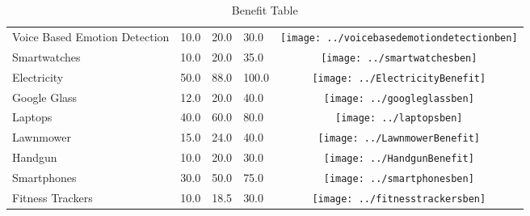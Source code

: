 \begin{table}[t]
\begin{center}
\begin{tabular}{| p{2cm} | p{1cm} | p{1cm} | p{1cm} | c |}
Voice Based Emotion Detection  & 10.0 & 20.0 & 30.0 & \texttt{[image: ../voicebasedemotiondetectionben]} \\ 
Smartwatches  & 10.0 & 20.0 & 35.0 & \texttt{[image: ../smartwatchesben]} \\ 
Electricity & 50.0 & 88.0 & 100.0 & \texttt{[image: ../ElectricityBenefit]} \\ 
Google Glass  & 12.0 & 20.0 & 40.0 & \texttt{[image: ../googleglassben]} \\ 
Laptops  & 40.0 & 60.0 & 80.0 & \texttt{[image: ../laptopsben]} \\ 
Lawnmower & 15.0 & 24.0 & 40.0 & \texttt{[image: ../LawnmowerBenefit]} \\ 
Handgun & 10.0 & 20.0 & 30.0 & \texttt{[image: ../HandgunBenefit]} \\ 
Smartphones  & 30.0 & 50.0 & 75.0 & \texttt{[image: ../smartphonesben]} \\ 
Fitness Trackers  & 10.0 & 18.5 & 30.0 & \texttt{[image: ../fitnesstrackersben]} \\ 
\hline
\end{tabular}
\caption{Benefit Table}
\label{top10}
\end{center}
\end{table}
